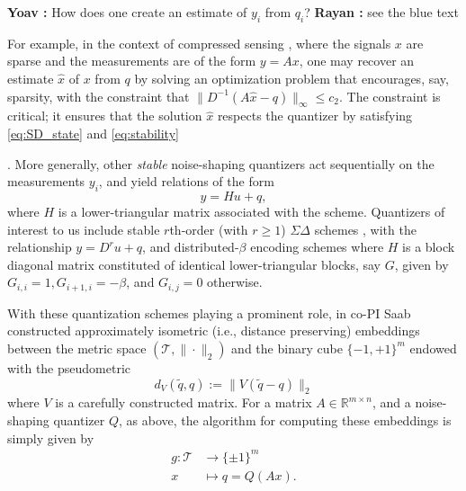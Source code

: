 \documentclass{article}
\newcommand{\comment}[3]{{\color{#1} {\bf #2 :} #3}}
\newcommand{\yoav}[1]{\comment{magenta}{Yoav}{#1}}
\newcommand{\rayan}[1]{\comment{red}{Rayan}{#1}}
\newcommand{\R}{\mathbb{R}}
\newcommand{\sign}{\mathrm{sign}}
\begin{document}
\yoav{How does one create an estimate of $y_i$ from $q_i$?}\rayan{see the blue text}{\color{blue}

For example, in the context of compressed sensing \cite{}, where the signals $x$ are sparse and the measurements are of the form $y = Ax$, one may recover an estimate $\hat{x}$ of $x$ from $q$ by solving an optimization problem  that encourages, say, sparsity, with the constraint that $\|D^{-1}(A\hat{x}-q)\|_\infty \leq c_2$. The constraint is critical; it ensures that the solution $\hat{x}$ respects the quantizer by satisfying \eqref{eq:SD_state}  and \eqref{eq:stability}}. More generally, other \emph{stable} noise-shaping quantizers act sequentially on the measurements $y_i$, %
and yield relations of the form 
$$ y=Hu + q,$$ where $H$ is a lower-triangular matrix associated with the scheme. Quantizers of interest to us include
stable $r$th-order (with $r\geq 1$) $\Sigma\Delta$ schemes  \cite{}, with the relationship $y=D^r u+q$, and distributed-$\beta$ encoding schemes \cite{} where $H$ is a block diagonal matrix constituted of identical lower-triangular blocks, say $G$, given by $G_{i,i}=1, G_{i+1,i}=-\beta$, and $G_{i,j}=0$ otherwise.

With these quantization schemes playing a prominent role, in  \cite{huynh2018fast} co-PI Saab  constructed approximately isometric (i.e., distance preserving) embeddings between the metric space  $(\mathcal{T}, \|\cdot\|_2)$ and the binary  cube $\{-1,+1\}^m$ endowed with the pseudometric
$$d_{{V}}(\tilde{q},q) := \| {V}(\tilde{q} -{q}) \|_2$$
where $V$ is a carefully constructed matrix.
For a  matrix $A\in\R^{m\times n}$, and a noise-shaping quantizer $Q$, as above, the algorithm for computing these embeddings is simply given by \begin{align}
g: \mathcal{T} &\to \{\pm 1\}^m\nonumber\\
x &\mapsto q=Q(Ax).\nonumber
\end{align}
\end{document}
